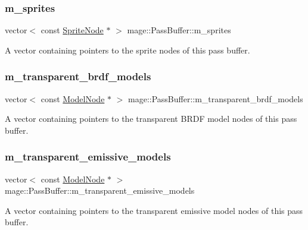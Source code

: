 \subsubsection{\texorpdfstring{m\+\_\+sprites}{m\_sprites}}
{\footnotesize\ttfamily vector$<$ const \hyperlink{classmage_1_1_sprite_node}{Sprite\+Node} $\ast$ $>$ mage\+::\+Pass\+Buffer\+::m\+\_\+sprites\hspace{0.3cm}{\ttfamily [private]}}

A vector containing pointers to the sprite nodes of this pass buffer. \hypertarget{structmage_1_1_pass_buffer_a2697c5e89c8e654ada78cbf15f5e8067}{}\label{structmage_1_1_pass_buffer_a2697c5e89c8e654ada78cbf15f5e8067} 
\subsubsection{\texorpdfstring{m\+\_\+transparent\+\_\+brdf\+\_\+models}{m\_transparent\_brdf\_models}}
{\footnotesize\ttfamily vector$<$ const \hyperlink{classmage_1_1_model_node}{Model\+Node} $\ast$ $>$ mage\+::\+Pass\+Buffer\+::m\+\_\+transparent\+\_\+brdf\+\_\+models\hspace{0.3cm}{\ttfamily [private]}}

A vector containing pointers to the transparent B\+R\+DF model nodes of this pass buffer. \hypertarget{structmage_1_1_pass_buffer_a6eeb7390dcdc25022e887ce110ff1fff}{}\label{structmage_1_1_pass_buffer_a6eeb7390dcdc25022e887ce110ff1fff} 
\subsubsection{\texorpdfstring{m\+\_\+transparent\+\_\+emissive\+\_\+models}{m\_transparent\_emissive\_models}}
{\footnotesize\ttfamily vector$<$ const \hyperlink{classmage_1_1_model_node}{Model\+Node} $\ast$ $>$ mage\+::\+Pass\+Buffer\+::m\+\_\+transparent\+\_\+emissive\+\_\+models\hspace{0.3cm}{\ttfamily [private]}}

A vector containing pointers to the transparent emissive model nodes of this pass buffer. 